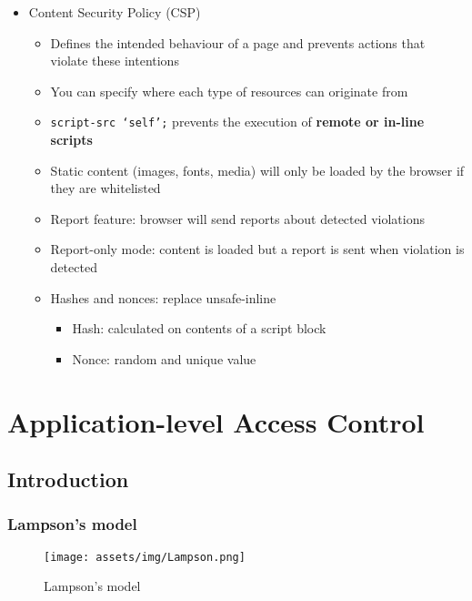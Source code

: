 \documentclass[12pt,titlepage,a4paper]{report}
\begin{document}
\begin{itemize}
				\item Content Security Policy (CSP)
				\begin{itemize}
					\item Defines the intended behaviour of a page and prevents actions that violate these intentions
					\item You can specify where each type of resources can originate from
					\item \texttt{script-src `self';} prevents the execution of \textbf{remote or in-line scripts}
					\item Static content (images, fonts, media) will only be loaded by the browser if they are whitelisted
					\item Report feature: browser will send reports about detected violations
					\item Report-only mode: content is loaded but a report is sent when violation is detected
					\item Hashes and nonces: replace unsafe-inline
					\begin{itemize}
						\item Hash: calculated on contents of a script block
						\item Nonce: random and unique value
					\end{itemize}
				\end{itemize}
			\end{itemize}
	
	
	\chapter{Application-level Access Control}
		\section{Introduction}
			\subsection{Lampson's model}
			\begin{figure}[h]
				\texttt{[image: assets/img/Lampson.png]}
				\caption{Lampson's model}
			\end{figure}
			
\end{document}
